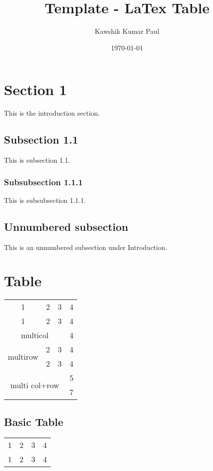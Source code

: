\documentclass[14pt, a4paper]{article} %
\title{Template - LaTex Table}
\author{Kawshik Kumar Paul}
\date{\today}
\begin{document}
\maketitle
\tableofcontents %
\pagebreak %

\section{Section 1}
\label{sec:intro} %
This is the introduction section.


\subsection{Subsection 1.1}
\label{subsec:1.1} %
This is subsection 1.1.


\subsubsection{Subsubsection 1.1.1}
This is subsubsection 1.1.1.


\subsection*{Unnumbered subsection}
This is an unnumbered subsection under Introduction. 

\section{Table}

\begin{tabular}{|c|c|c|c|}
    \hline
	1 & 2 & 3 & 4 \\ 
	\cline{1-3}
	1 & 2 & 3 & 4  \\
	\hline
	\multicolumn{3}{|c|}{multicol} & 4 \\
	\hline
	\multirow{2}{*}{multirow} & 2 & 3 & 4\\
	\cline{2-4}
	& 2 & 3 & 4 \\
	\hline
	\multicolumn{3}{|c|}{\multirow{2}{*}{multi col+row}} & 5 \\
	\multicolumn{3}{|c|}{} & 7 \\
	\hline
\end{tabular}

\subsection{Basic Table}
\begin{tabular}{|c|ccc|}
	\hline
	1 & 2 & 3 & 4 \\ 
	\cline{1-3}
	1 & 2 & 3 & 4  \\
	\hline

\end{tabular}
\end{document}

